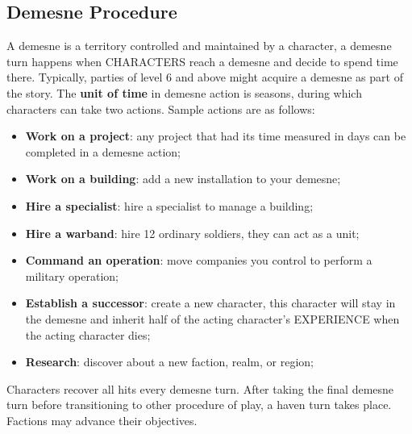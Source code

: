 \subsection{Demesne Procedure}
A demesne is a territory controlled and maintained by a character, a demesne turn happens when CHARACTERS reach a demesne and decide to spend time there. Typically, parties of level 6 and above might acquire a demesne as part of the story. The \textbf{unit of time} in demesne action is seasons, during which characters can take two actions. Sample actions are as follows:
\begin{itemize}
    \item {\textbf{Work on a project}: any project that had its time measured in days can be completed in a demesne action;}
    \item {\textbf{Work on a building}: add a new installation to your demesne;}
    \item {\textbf{Hire a specialist}: hire a specialist to manage a building;}
    \item {\textbf{Hire a warband}: hire 12 ordinary soldiers, they can act as a unit;}
    \item {\textbf{Command an operation}: move companies you control to perform a military operation;}
    \item {\textbf{Establish a successor}: create a new character, this character will stay in the demesne and inherit half of the acting character's EXPERIENCE when the acting character dies;}
    \item {\textbf{Research}: discover about a new faction, realm, or region;}
\end{itemize}
Characters recover all hits every demesne turn. After taking the final demesne turn before transitioning to other procedure of play, a haven turn takes place. Factions may advance their objectives.

